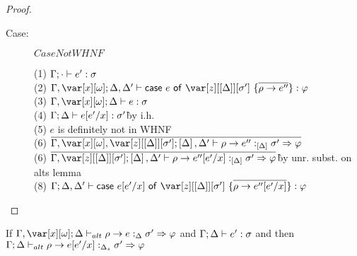 \begin{proof}
\begin{description}
\item[Case:] $CaseNotWHNF$
\begin{tabbing}
    (1) $\Gamma;\cdot \vdash e' : \sigma$\\
    (2) $\G,\xo;\D,\D' \vdash \ccase{e}{\z[\irr{\D}][\s']~\{\ov{\rho \to e''}\}} : \vp$\\
    (3) $\G,\xo;\D \vdash e :\s$\\
    (4) $\Gamma;\Delta \vdash e [e'/x] : \sigma'$\`by i.h.\\
    (5) $e$ is definitely not in WHNF\\
    (6) $\ov{\G,\xo,\z[\irr{\D}][\s'];\irr{\D},\D' \vdash \rho \to e'' :_{\irr{\D}} \s' \Rightarrow \vp}$\\
    (6) $\ov{\G,\z[\irr{\D}][\s'];\irr{\D},\D' \vdash \rho \to e''[e'/x] :_{\irr{\D}} \s' \Rightarrow \vp}$\`by unr. subst.  on alts lemma\\
    (8) $\G;\D,\D' \vdash \ccase{e[e'/x]}{\z[\irr{\D}][\s']~\{\ov{\rho \to e''[e'/x]}\}} : \vp$\\
\end{tabbing}

\end{description}

\end{proof}

\begin{sublemma}
If $\G, \xo; \D \vdash_{alt} \rho \to e :_\Delta \s' \Rightarrow \vp$ and $\Gamma; \Delta \vdash e' : \sigma$ and
    then $\Gamma; \Delta \vdash_{alt} \rho \to e[e'/x] :_{\Delta_s} \sigma' \Rightarrow \varphi$
\end{sublemma}

